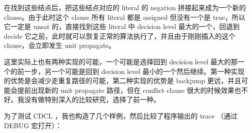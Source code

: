 \documentclass[11pt,a4paper]{ctexart}
\begin{document}
在找到这些结点后，把这些结点对应的 literal 的 negation 拼接起来成为一个新的 clause。由于此时这个 clause 所有 literal 都是 assigned 但没有一个是 true，所以它一定是 unsat 的，直接找到这些 literal 中 decision level 最大的一个，回退到 decide 它之前，此时就可以恢复正常的算法执行了，并且由于刚刚插入的这个 clause，会立即发生 unit propagate。

这里实际上也有两种实现的可能，一个可能是选择回到 decision level 最大的那一个的前一步，另一个可能是回到 decision level 最小的一个然后继续。第一种实现的优势是会减少走重复路径的可能，第二种实现的优势是 backjump 更远，并且可能会提前出现新的 unit propagate 路径，但在 conflict clause 很大的时候效果也不好。我没有做特别深入的比较研究，选择了前一种。

为了测试 CDCL ，我也构造了几个样例，然后比较了程序输出的 trace （通过 DEBUG 宏打开）：

\begin{lstlisting}
\end{lstlisting}

\printbibliography
\end{document}
